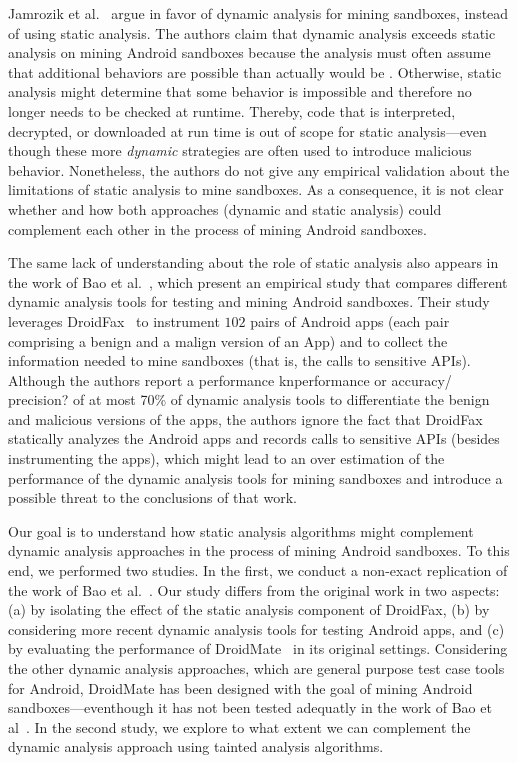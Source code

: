 Jamrozik et al.~\cite{DBLP:conf/icse/JamrozikSZ16} argue in favor of dynamic analysis for mining sandboxes, instead of using static analysis. The authors claim that dynamic analysis exceeds static analysis on mining Android sandboxes because the analysis must often assume that additional behaviors are possible than actually would be . Otherwise, static analysis might determine that some behavior is impossible and therefore no longer needs to be checked at runtime. Thereby, code that is interpreted, decrypted, or downloaded at run time is out of scope for static analysis---even though these more \emph{dynamic} strategies are often used to introduce malicious behavior. Nonetheless, the authors do not give any empirical validation about the limitations of static analysis to mine sandboxes. As a consequence, it is not clear whether and how both approaches (dynamic and static analysis) could complement each other in the process of mining Android sandboxes.

The same lack of understanding about the role of static analysis also appears in the work of Bao et al.~\cite{DBLP:conf/wcre/BaoLL18}, which present an empirical study that compares different dynamic analysis tools for testing and mining Android sandboxes. Their study leverages DroidFax~\cite{DBLP:conf/icsm/CaiR17a} to instrument $102$ pairs of Android apps (each pair comprising a benign and a malign version of an App) and to collect the information needed to mine sandboxes (that is, the calls to sensitive APIs).
Although the authors report a performance kn{performance or accuracy/ precision?} of at most 70\% of dynamic analysis tools to differentiate the benign and malicious versions of the apps, the authors ignore the fact that DroidFax statically analyzes the Android apps and records calls to sensitive APIs (besides instrumenting the apps), which might lead to an over estimation of the performance of the dynamic analysis tools for mining sandboxes and introduce a possible threat to the conclusions of that work.

Our goal is to understand how static analysis
algorithms might complement dynamic analysis approaches in the process of mining Android sandboxes. To this end, we performed two studies. In the
first, we conduct a non-exact replication of the work of Bao et al.~\cite{DBLP:conf/wcre/BaoLL18}. Our study differs from the original work in two aspects: (a)
by isolating the effect of the static analysis component of DroidFax, (b) by considering more recent dynamic analysis tools for testing Android apps,
and (c) by evaluating the performance of DroidMate~\cite{DBLP:conf/icse/JamrozikZ16} in its original settings. Considering the other dynamic analysis approaches, which are
general purpose test case tools for Android, DroidMate has been designed with the goal of mining Android sandboxes---eventhough it has not been tested adequatly
in the work of Bao et al~\cite{DBLP:conf/wcre/BaoLL18}. In the second study, we explore to what extent we can complement the dynamic analysis approach using
tainted analysis algorithms.


